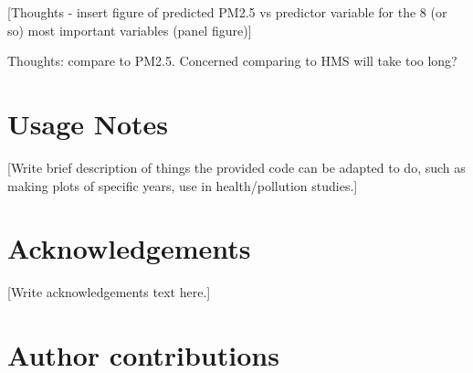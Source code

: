 \documentclass[english]{article}
\begin{document}
[Thoughts - insert figure of predicted PM2.5 vs predictor variable for the 8 (or so) most important variables (panel figure)]

Thoughts: compare to PM2.5. Concerned comparing to HMS will take too long? 


\section*{Usage Notes}



[Write brief description of things the provided code can be adapted to do, such as making plots of specific years, use in health/pollution studies.]

\section*{Acknowledgements}


[Write acknowledgements text here.]

\section*{Author contributions}

\end{document}
